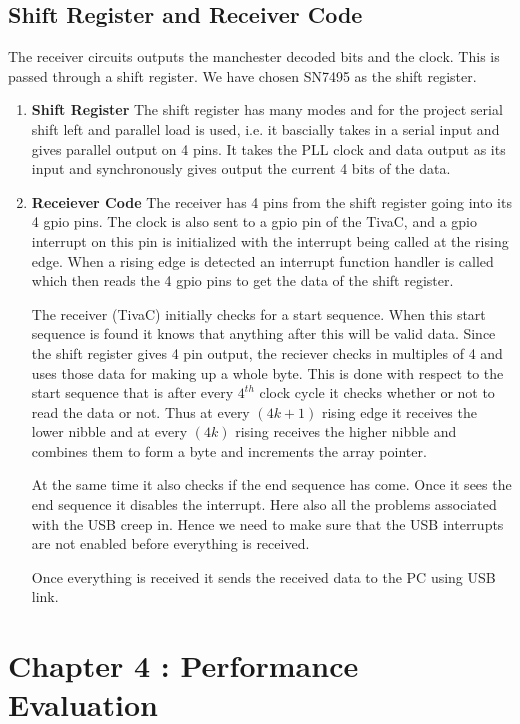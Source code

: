 \documentclass{article}
\begin{document}
\subsection{Shift Register and Receiver Code}
The receiver circuits outputs the manchester decoded bits and the clock. This is passed through a shift register. We have chosen SN7495 as the shift register. 
\begin{enumerate}
\item \textbf{Shift Register}
  The shift register has many modes and for the project serial shift left and parallel load is used, i.e. it bascially takes in a serial input and gives parallel output on 4 pins. It takes the PLL clock and data output as its input and synchronously gives output the current 4 bits of the data.
\item \textbf{Receiever Code}
  The receiver has 4 pins from the shift register going into its 4 gpio pins. The clock is also sent to a gpio pin of the TivaC, and a gpio interrupt on this pin is initialized with the interrupt being called at the rising edge. When a rising edge is detected an interrupt function handler is called which then reads the 4 gpio pins to get the data of the shift register. 
  
  The receiver (TivaC) initially checks for a start sequence. When this start sequence is found it knows that anything after this will be valid data. Since the shift register gives 4 pin output, the reciever checks in multiples of 4 and uses those data for making up a whole byte. This is done with respect to the start sequence that is after every $4^{th}$ clock cycle it checks whether or not to read the data or not. Thus at every $(4k+1)$ rising edge it receives the lower nibble and at every $(4k)$ rising receives the higher nibble and combines them to form a byte and increments the array pointer.  

  At the same time it also checks if the end sequence has come. Once it sees the end sequence it disables the interrupt. Here also all the problems associated with the USB creep in. Hence we need to make sure that the USB interrupts are not enabled before everything is received.

  Once everything is received it sends the received data to the PC using USB link.
\end{enumerate}



\section{Chapter 4 : Performance Evaluation}
\end{document}
